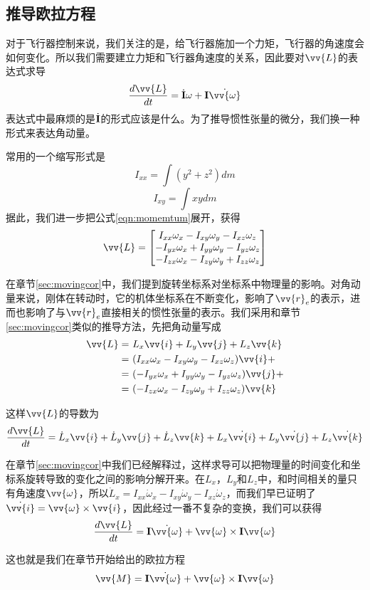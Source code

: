 \documentclass[11pt]{article}
\begin{document}
\subsection{推导欧拉方程}
对于飞行器控制来说，我们关注的是，给飞行器施加一个力矩，飞行器的角速度会如何变化。所以我们需要建立力矩和飞行器角速度的关系，因此要对$\vv{L}$的表达式求导
$$
\frac{d\vv{L}}{dt} = \dot{{\bf I}}\omega + {\bf I} \dot{\vv{\omega}}   
$$
表达式中最麻烦的是$\dot{{\bf I}}$的形式应该是什么。为了推导惯性张量的微分，我们换一种形式来表达角动量。

常用的一个缩写形式是
$$
I_{xx} = \int (y^2+z^2) dm
$$
$$
I_{xy} = \int xy dm
$$
据此，我们进一步把公式\ref{eqn:momemtum}展开，获得
$$
\vv{L} = 
\begin{bmatrix}
I_{xx}\omega_x-I_{xy}\omega_y-I_{xz}\omega_z\\
-I_{yx}\omega_x+I_{yy}\omega_y-I_{yz}\omega_z\\
-I_{zx}\omega_x-I_{zy}\omega_y+I_{zz}\omega_z
\end{bmatrix}
$$

在章节\ref{sec:movingcor}中，我们提到旋转坐标系对坐标系中物理量的影响。对角动量来说，刚体在转动时，它的机体坐标系在不断变化，影响了$\vv{r}_e$的表示，进而也影响了与$\vv{r}_e$直接相关的惯性张量的表示。我们采用和章节\ref{sec:movingcor}类似的推导方法，先把角动量写成
\begin{align*}
\vv{L} = & \ L_x \vv{i} + L_y \vv{j} + L_z \vv{k} \\
	   = & \ (I_{xx}\omega_x-I_{xy}\omega_y-I_{xz}\omega_z)\vv{i} + \\
	   = & \ (-I_{yx}\omega_x+I_{yy}\omega_y-I_{yz}\omega_z)\vv{j} + \\
	   = & \ (-I_{zx}\omega_x-I_{zy}\omega_y+I_{zz}\omega_z)\vv{k} 
\end{align*}

这样$\vv{L}$的导数为
$$
\frac{d\vv{L}}{dt} =  \dot{L}_x \vv{i} + \dot{L}_y \vv{j} + \dot{L}_z \vv{k} + L_x \dot{\vv{i}} + L_y \dot{\vv{j}} + L_z \dot{\vv{k}} 
$$

在章节\ref{sec:movingcor}中我们已经解释过，这样求导可以把物理量的时间变化和坐标系旋转导致的变化之间的影响分解开来。在$L_x$，$L_y$和$L_z$中，和时间相关的量只有角速度$\vv{\omega}$，所以$\dot{L}_x = I_{xx}\dot{\omega}_x-I_{xy}\dot{\omega}_y-I_{xz}\dot{\omega}_z$，而我们早已证明了$\dot{\vv{i}} = \vv{\omega} \times \vv{i}$，因此经过一番不复杂的变换，我们可以获得
$$
\frac{d\vv{L}}{dt} = {\bf I}\dot{\vv{\omega}} + \vv{\omega}\times{\bf I}\vv{\omega}
$$

这也就是我们在章节开始给出的欧拉方程
$$
\vv{M} = {\bf I}\dot{\vv{\omega}} + \vv{\omega} \times {\bf I}\vv{\omega}
$$
\end{document}
